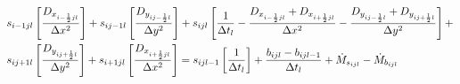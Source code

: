 \begin{equation*}
    \begin{split}
        &
        s_{i-1jl}
            \left[
                \frac{D_{x_{i-\frac{1}{2} jl}}}
                {\Delta x^2}
            \right]
            +
            s_{ij-1l}
            \left[
                \frac
                    {D_{y_{ij-\frac{1}{2} l}}}
                    {\Delta y^2}
            \right]
            +
            s_{ijl}
            \left[
                \frac
                    {1}
                    {\Delta t_{l}}
                -
                \frac
                    {D_{x_{i-\frac{1}{2} jl}} + D_{x_{i+\frac{1}{2} jl}}}
                    {\Delta x^2}
                -
                \frac
                    {D_{y_{ij-\frac{1}{2} l}} + D_{y_{ij+\frac{1}{2} l}}}
                    {\Delta y^2}
            \right]
            +
            \\ &
            s_{ij+1l}
            \left[
                \frac
                    {D_{y_{ij+\frac{1}{2} l}}}
                    {\Delta y^2}        
            \right]
            +
            s_{i+1jl}
            \left[
                \frac
                    {D_{x_{i+\frac{1}{2} jl}}}
                    {\Delta x^2}
            \right]
            =
            s_{ijl-1}
            \left[
                \frac
                    {1}
                    {\Delta t_{l}}
            \right]
            +
            \frac
                {b_{ijl} - b_{ijl-1}}
                {\Delta t_{l}}
            +
            \dot{M}_{s_{ijl}}
            -
            \dot{M}_{b_{ijl}}
    \end{split}
\end{equation*}

